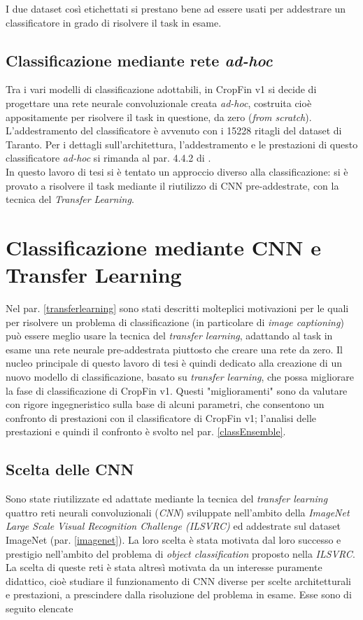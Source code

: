 I due dataset così etichettati si prestano bene ad essere usati per addestrare un classificatore in grado di risolvere il task in esame.

\subsection*{Classificazione mediante rete \textit{ad-hoc}}
Tra i vari modelli di classificazione adottabili, in CropFin v1 si decide di progettare una rete neurale convoluzionale creata \textit{ad-hoc}, costruita cioè appositamente per risolvere il task in questione, da zero (\textit{from scratch}). L'addestramento del classificatore è avvenuto con i 15228 ritagli del dataset di Taranto.
Per i dettagli sull'architettura, l'addestramento e le prestazioni di questo classificatore \textit{ad-hoc} si rimanda al par. 4.4.2 di \cite{gianvito}.\\

In questo lavoro di tesi si è tentato un approccio diverso alla classificazione: si è provato a risolvere il task mediante il riutilizzo di CNN pre-addestrate, con la tecnica del \textit{Transfer Learning}.


\section{Classificazione mediante CNN e Transfer Learning}
\label{esperimentoTL}
Nel par. \ref{transferlearning} sono stati descritti molteplici motivazioni per le quali per risolvere un problema di classificazione (in particolare di \textit{image captioning}) può essere meglio usare la tecnica del \textit{transfer learning}, adattando al task in esame una rete neurale pre-addestrata piuttosto che creare una rete da zero.
Il nucleo principale di questo lavoro di tesi è quindi dedicato alla creazione di un nuovo modello di classificazione, basato su \textit{transfer learning}, che possa migliorare la fase di classificazione di CropFin v1. Questi "miglioramenti" sono da valutare con rigore ingegneristico sulla base di alcuni parametri, che consentono un confronto di prestazioni con il classificatore di CropFin v1; l'analisi delle prestazioni e quindi il confronto è svolto nel par. \ref{classEnsemble}.

\subsection{Scelta delle CNN}
Sono state riutilizzate ed adattate mediante la tecnica del \textit{transfer learning} quattro reti neurali convoluzionali (\textit{CNN}) sviluppate nell'ambito della \textit{ImageNet Large Scale Visual Recognition Challenge (ILSVRC)} ed addestrate sul dataset ImageNet (par. \ref{imagenet}). La loro scelta è stata motivata dal loro successo e prestigio nell'ambito del problema di \textit{object classification} proposto nella \textit{ILSVRC}. La scelta di queste reti è stata altresì motivata da un interesse puramente didattico, cioè studiare il funzionamento di CNN diverse per scelte architetturali e prestazioni, a prescindere dalla risoluzione del problema in esame. Esse sono di seguito elencate

